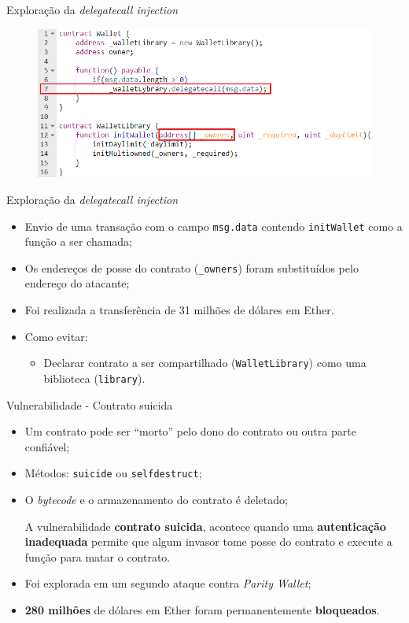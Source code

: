 \begin{frame}{Exploração da \textit{delegatecall injection}}
    \begin{figure}[!htb]
     \centering
     \includegraphics[scale=0.5]{figuras/contratos-inteligentes/delegatecall-passo1.png}
    \end{figure}    
\end{frame}

\begin{frame}{Exploração da \textit{delegatecall injection}}
    \begin{itemize}
        \item Envio de uma transação com o campo \texttt{msg.data} contendo \texttt{initWallet} como a função a ser chamada;
        \item Os endereços de posse do contrato (\texttt{\_owners}) foram substituídos pelo endereço do atacante;
        \item Foi realizada a transferência de 31 milhões de dólares em Ether.
        \item Como evitar: 
        \begin{itemize}
            \item Declarar contrato a ser compartilhado (\texttt{WalletLibrary}) como uma biblioteca (\texttt{library}).
        \end{itemize}
    \end{itemize}
\end{frame}

\begin{frame}{Vulnerabilidade - Contrato suicida}
    \begin{itemize}
        \item Um contrato pode ser ``morto'' pelo dono do contrato ou outra parte confiável;
        \item Métodos: \texttt{suicide} ou \texttt{selfdestruct};
        \item O \textit{bytecode} e o armazenamento do contrato é deletado;
        \begin{block}{}
        A vulnerabilidade \textbf{contrato suicida}, acontece quando uma \textbf{autenticação inadequada} permite que algum invasor tome posse do contrato e execute a função para matar o contrato.
        \end{block}
        \item Foi explorada em um segundo ataque contra \textit{Parity Wallet};
        \item \textbf{280 milhões} de dólares em Ether foram permanentemente \textbf{bloqueados}.
    \end{itemize}
\end{frame}

